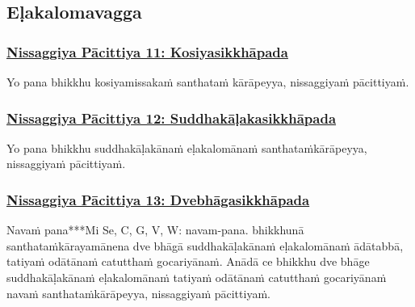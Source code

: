 \subsection{Eḷakalomavagga}

\subsubsection*{\hyperref[forf-exp11]{Nissaggiya Pācittiya 11: Kosiyasikkhāpada}}
\label{np11}

Yo pana bhikkhu kosiyamissakaṁ santhataṁ kārāpeyya, nissaggiyaṁ pācittiyaṁ.



\subsubsection*{\hyperref[forf-exp12]{Nissaggiya Pācittiya 12: Suddhakāḷakasikkhāpada}}
\label{np12}

Yo pana bhikkhu suddhakāḷakānaṁ eḷakalomānaṁ santhataṁ\makeatletter\hyperlink{endnote178-appendix}\makeatother \thinspace kārāpeyya, nissaggiyaṁ pācittiyaṁ.



\subsubsection*{\hyperref[forf-exp13]{Nissaggiya Pācittiya 13: Dvebhāgasikkhāpada}}
\label{np13}

Navaṁ pana***Mi Se, C, G, V, W: navam-pana. bhikkhunā santhataṁ\makeatletter\hyperlink{endnote179-appendix}\makeatother \thinspace kārayamānena dve bhāgā suddhakāḷakānaṁ eḷakalomānaṁ ādātabbā, tatiyaṁ odātānaṁ catutthaṁ gocariyānaṁ. Anādā ce bhikkhu dve bhāge suddhakāḷakānaṁ eḷakalomānaṁ tatiyaṁ odātānaṁ catutthaṁ gocariyānaṁ navaṁ santhataṁ\makeatletter\hyperlink{endnote180-appendix}\makeatother \thinspace kārāpeyya, nissaggiyaṁ pācittiyaṁ.



